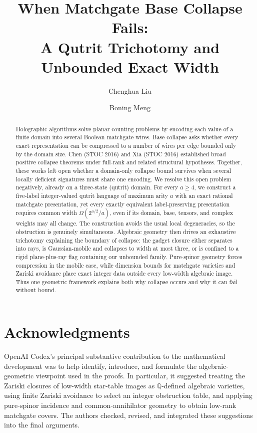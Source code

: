 \documentclass[11pt]{article}
\title{When Matchgate Base Collapse Fails:\\
A Qutrit Trichotomy and Unbounded Exact Width}
\author[1]{Chenghua Liu}
\author[2]{Boning Meng}
\affil[1]{Institute of Software, Chinese Academy of Sciences, Beijing, China}
\affil[2]{University of Regensburg, Regensburg, Germany}
\affil[ ]{\texttt{liuch.russell@gmail.com}, \texttt{mengboning2013@gmail.com}}
\date{}
\theoremstyle{definition}
\theoremstyle{remark}
\newcommand{\Q}{\mathbb Q}
\begin{document}
\maketitle

\begin{abstract}
Holographic algorithms solve planar counting problems by encoding each value
of a finite domain into several Boolean matchgate wires.  Base collapse asks
whether every exact representation can be compressed to a number of wires per
edge bounded only by the domain size.  Chen (STOC 2016) and Xia (STOC 2016)
established broad positive collapse theorems under full-rank and related
structural hypotheses.  Together, these works left open whether a domain-only
collapse bound survives when several locally deficient signatures must share
one encoding.  We resolve this open problem negatively, already on a
three-state (qutrit) domain.  For every $a\ge4$, we construct a five-label
integer-valued qutrit language of maximum arity $a$ with an exact rational
matchgate presentation, yet every exactly equivalent label-preserving
presentation requires common width $\Omega(2^{a/2}/a)$, even if its domain,
base, tensors, and complex weights may all change.  The construction avoids
the usual local degeneracies, so the obstruction is genuinely simultaneous.
Algebraic geometry then drives an exhaustive trichotomy explaining the
boundary of collapse: the gadget closure either separates into rays, is
Gaussian-mobile and collapses to width at most three, or is confined to a
rigid plane-plus-ray flag containing our unbounded family.  Pure-spinor
geometry forces compression in the mobile case, while dimension bounds for
matchgate varieties and Zariski avoidance place exact integer data outside
every low-width algebraic image.  Thus one geometric framework explains both
why collapse occurs and why it can fail without bound.
\end{abstract}


\section*{Acknowledgments}
OpenAI Codex's principal substantive contribution to the mathematical
development was to help identify, introduce, and formulate the
algebraic-geometric viewpoint used in the proofs.  In particular, it suggested
treating the Zariski closures of low-width star-table images as
$\Q$-defined algebraic varieties, using finite Zariski avoidance to select an
integer obstruction table, and applying pure-spinor incidence and
common-annihilator geometry to obtain low-rank matchgate covers.  The authors
checked, revised, and integrated these suggestions into the final arguments.
\end{document}
